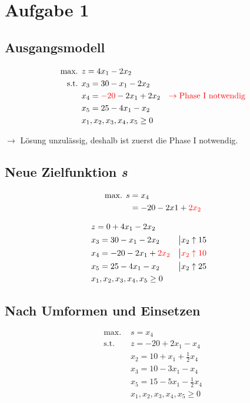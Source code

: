 \documentclass[a4paper,11pt]{article}
\begin{document}
\raggedright %


\section*{Aufgabe 1}
\subsection*{Ausgangsmodell}
\begin{align*}
\text{max. } & z = 4x_1 - 2x_2 \\
\text{s.t. } & x_3 = 30 - x_1 - 2x_2 \\
& x_4 = {\color{red} -20} - 2x_1 + 2x_2  & \color{red} \to \text{Phase I notwendig} \\
& x_5 = 25 -4x_1 - x_2 \\
& x_1, x_2, x_3, x_4, x_5 \ge 0 \\
\end{align*}

$\to$ Lösung unzulässig, deshalb ist zuerst die Phase I notwendig. \\

\subsection*{Neue Zielfunktion \emph{s}}
\begin{align*}
\text{max. } s &= x_4 \\
&= -20 - 2x1 + {\color{red} 2x_2}
\end{align*}

\begin{align*}
& z = 0 + 4x_1 - 2x_2 \\
& x_3 = 30 - x_1 - 2x_2 &&\big| x_2 \uparrow 15 \\
& x_4 = -20 - 2x_1 + {\color{red} 2x_2} &&\big| \color{red} x_2 \uparrow 10 \\
& x_5 = 25 -4x_1 - x_2 &&\big| x_2 \uparrow 25 \\
& x_1, x_2, x_3, x_4, x_5 \ge 0 \\
\end{align*}

\subsection*{Nach Umformen und Einsetzen}
\begin{align*}
\text{max. } & s = x_4 \\
\text{s.t. } & z = -20 + 2x_1 - x_4 \\
& x_2 = 10 + x_1 + \frac{1}{2}x_4 \\
& x_3 = 10 - 3x_1 - x_4 \\
& x_5 = 15 - 5x_1 - \frac{1}{2}x_4 \\
& x_1, x_2, x_3, x_4, x_5 \ge 0
\end{align*}
\end{document}
